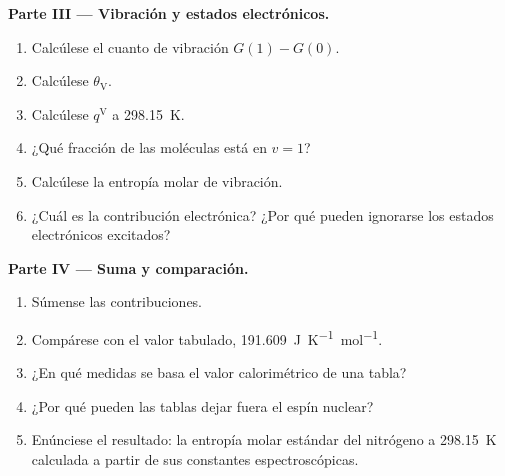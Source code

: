 \begin{problem}
\medskip\noindent\textbf{Parte III --- Vibración y estados electrónicos.}
\begin{enumerate}[resume]
  \item Calcúlese el cuanto de vibración $G(1) - G(0)$.
  \item Calcúlese $\theta_{\mathrm V}$.
  \item Calcúlese $q^{\mathrm V}$ a \qty{298.15}{K}.
  \item ¿Qué fracción de las moléculas está en $v = 1$?
  \item Calcúlese la entropía molar de vibración.
  \item ¿Cuál es la contribución electrónica? ¿Por qué pueden ignorarse los estados electrónicos
        excitados?
\end{enumerate}

\medskip\noindent\textbf{Parte IV --- Suma y comparación.}
\begin{enumerate}[resume]
  \item Súmense las contribuciones.
  \item Compárese con el valor tabulado, \qty{191.609}{J.K^{-1}.mol^{-1}}.
  \item ¿En qué medidas se basa el valor calorimétrico de una tabla?
  \item ¿Por qué pueden las tablas dejar fuera el espín nuclear?
  \item Enúnciese el resultado: la entropía molar estándar del nitrógeno a \qty{298.15}{K}
        calculada a partir de sus constantes espectroscópicas.
\end{enumerate}
\end{problem}
